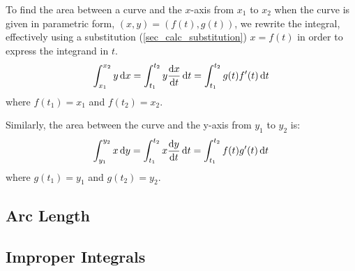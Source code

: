 To find the area between a curve and the \(x\)-axis from \(x_1\) to \(x_2\)
when the curve is given in parametric form, \((x, y) = (f(t), g(t))\),
we rewrite the integral, effectively using a substitution
(\ref{sec_calc_substitution}) \(x = f(t)\) in order to express the integrand
in \(t\).
\begin{equation*}
 \integ[x_1]<x_2>{y}{x} =
 \integ[t_1]<t_2>{y \dv<x>{t}}{t} =
 \integ[t_1]<t_2>{g(t)f'(t)}{t}
\end{equation*}
where \(f(t_1) = x_1\) and \(f(t_2) = x_2\).

Similarly, the area between the curve and the y-axis from \(y_1\) to \(y_2\)
is:
\begin{equation*}
 \integ[y_1]<y_2>{x}{y} =
 \integ[t_1]<t_2>{x \dv<y>{t}}{t} =
 \integ[t_1]<t_2>{f(t)g'(t)}{t}
\end{equation*}
where \(g(t_1) = y_1\) and \(g(t_2) = y_2\).

\subsection{Arc Length}

\subsection{Improper Integrals}

